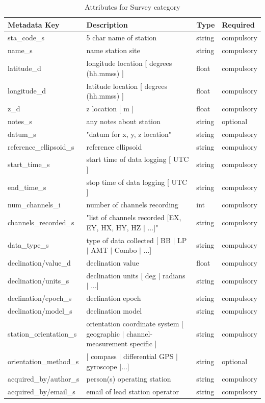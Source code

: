 \documentclass{article}
\begin{document}
\begin{table}[htb!]
	\caption[Attributes for Survey]{Attributes for Survey category}
	\begin{tabular}{|l|p{3in}|l|l|}
		\hline
		\textbf{Metadata Key} & \textbf{Description} & \textbf{Type} & \textbf{Required} \\ \hline
		sta\_code\_s & 5 char name of station & string & compulsory \\ \hline
		name\_s & name station site & string & compulsory \\ \hline
		latitude\_d & longitude location [ degrees (hh.mmss) ] & float & compulsory \\ \hline
		longitude\_d & latitude location [ degrees (hh.mmss) ] & float & compulsory \\ \hline
		z\_d & z location [ m ] & float & compulsory \\ \hline
		notes\_s & any notes about station & string & optional \\ \hline
		datum\_s & "datum for x, y, z location" & string & compulsory \\ \hline
		reference\_ellipsoid\_s & reference ellipsoid & string & compulsory \\ \hline
		start\_time\_s & start time of data logging [ UTC ] & string & compulsory \\ \hline
		end\_time\_s & stop time of data logging  [ UTC ] & string & compulsory \\ \hline
		num\_channels\_i & number of channels recording & int & compulsory \\ \hline
		channels\_recorded\_s & "list of channels recorded [EX, EY, HX, HY, HZ $|$ ...]" & string & compulsory \\ \hline
		data\_type\_s & type of data collected [ BB $|$ LP $|$ AMT $|$ Combo $|$ ...] & string & compulsory \\ \hline
		declination/value\_d & declination value & float & compulsory \\ \hline
		declination/units\_s & declination units [ deg $|$ radians $|$ ...] & string & compulsory \\ \hline
		declination/epoch\_s & declination epoch & string & compulsory \\ \hline
		declination/model\_s & declination model & string & compulsory \\ \hline
		station\_orientation\_s & orientation coordinate system [ geographic $|$ channel-measurement specific ] & string & compulsory \\ \hline
		orientation\_method\_s & [ compass $|$ differential GPS $|$ gyroscope $|$...] & string & optional \\ \hline
		acquired\_by/author\_s & person(s) operating station & string & compulsory \\ \hline
		acquired\_by/email\_s & email of lead station operator & string & compulsory \\ \hline
	\end{tabular}
\label{tab:station01}
\end{table}	
\end{document}

